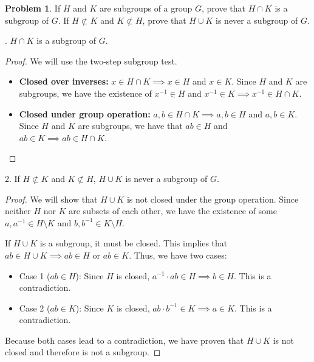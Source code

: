 \documentclass[12pt,reqno]{article}
\theoremstyle{plain}
\theoremstyle{definition}
\newtheorem{problem}{Problem}
\begin{document}
\begin{problem}
    If $H$ and $K$ are subgroups of a group $G$, prove that $H \cap K$ is a subgroup of $G$. If $H \not \subset K$ and $K \not \subset H$, prove that $H \cup K$ is never a subgroup of $G$.
\end{problem}

. \(H\cap K\) is a subgroup of \(G\).

\begin{proof}
    We will use the two-step subgroup test.
    \begin{itemize}
        \item \textbf{Closed over inverses:} \(x\in H\cap K \implies x\in H\) and
        \(x\in K\). Since \(H\) and \(K\) are subgroups, we have the existence of \(x^{-1}\in H\) and 
        \(x^{-1}\in K \implies x^{-1}\in H\cap K\). 

        \item \textbf{Closed under group operation:} \(a,b\in H\cap K\implies a,b\in H\) and \(a,b\in K\).
        Since \(H\) and \(K\) are subgroups, we have that \(ab\in H\) and \(ab\in K\implies ab\in H\cap K\).
    \end{itemize}
\end{proof}

2. If $H \not \subset K$ and $K \not \subset H$, $H \cup K$ is never a subgroup of $G$.
\begin{proof}
    We will show that \(H\cup K\) is not closed under the group operation. 
    Since neither \(H\) nor \(K\) are subsets of each other, we have the existence of some 
    \(a,a^{-1}\in H\setminus K\) and \(b,b^{-1}\in K\setminus H\).

    If \(H\cup K\) is a subgroup, it must be closed. This implies that 
    \(ab\in H\cup K \implies ab\in H\) or \(ab\in K\). Thus, we have two cases:

    \begin{itemize}
        \item Case 1 (\(ab\in H\)): Since \(H\) is closed, \(a^{-1}\cdot ab \in H\implies b\in H\). This is a contradiction.

        \item Case 2 (\(ab\in K\)): Since \(K\) is closed, \(ab\cdot b^{-1}\in K\implies a\in K\). This is a contradiction.
    \end{itemize}

    Because both cases lead to a contradiction, we have proven that \(H\cup K\) is not closed
    and therefore is not a subgroup.
\end{proof}
\end{document}
